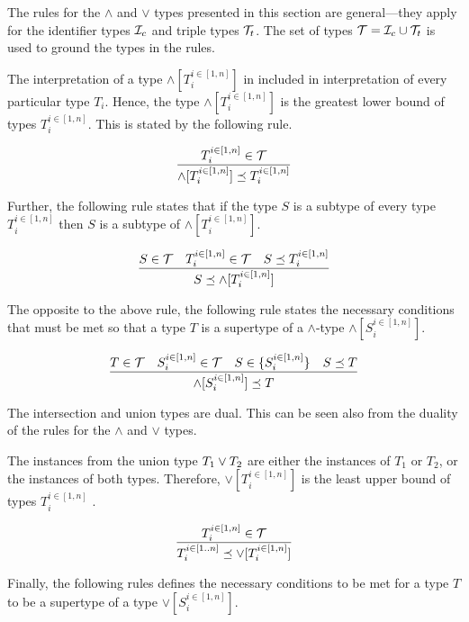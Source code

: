 \documentclass[runningheads]{llncs}
\newcommand{\I}{{\cal I}}
\newcommand{\T}{{\cal T}}
\begin{document}
The rules for the $\land$ and $\lor$ types presented in this section
are general---they apply for the identifier types $\I_c$ and triple
types $\T_t$. The set of types $\T=\I_c\cup\T_t$ is used to ground
the types in the rules.

The interpretation of a type $\land[T_i^{i\in[1,n]}]$ in included in
interpretation of every particular type $T_i$. Hence, the type
$\land[T_i^{i\in[1,n]}]$ is the greatest lower bound of types
$T_i^{i\in[1,n]}$. This is stated by the following rule.

\begin{equation}
\label{rul:land-preceq-elems}
\dfrac{T_i^{i\in[1,n]}\in\T}
      {\land[T_i^{i\in[1,n]}] \preceq\/T_i^{i\in[1,n]}} 
\end{equation}

Further, the following rule states that if the type $S$ is a subtype
of every type $T_i^{i\in[1,n]}$ then $S$ is a subtype of
$\land[T_i^{i\in[1,n]}]$.

\begin{equation}
\label{rul:lbound-preceq-land}
\dfrac{S\in\T\quad\/T_i^{i\in[1,n]}\in\T\quad\/S\preceq\/T_i^{i\in[1,n]}}
      {S\preceq\land[T_i^{i\in[1,n]}]}  
\end{equation} 

The opposite to the above rule, the following rule states the
necessary conditions that must be met so that a type $T$ is a
supertype of a $\land$-type $\land[S_i^{i\in[1,n]}]$.

\begin{equation}
\label{rul:land-preceq-ubound}
\dfrac{T\in\T\quad\/S_i^{i\in[1,n]}\in\T\quad\/S\in\{S_i^{i\in[1,n]}\}\quad\/S\preceq\/T}
      {\land[S_i^{i\in[1,n]}]\preceq\/T}  
\end{equation} 

The intersection and union types are dual. This can be seen also from
the duality of the rules for the $\land$ and $\lor$ types.

The instances from the union type $T_1\lor\/T_2$ are either the
instances of $T_1$ or $T_2$, or the instances of both
types. Therefore, $\lor[T_i^{i\in[1,n]}]$ is the least upper bound of
types $T_i^{i\in[1,n]}$ \cite{Pierce1991}.

\begin{equation}
\label{rul:lor-preceq-elems}
\dfrac{T_i^{i\in[1,n]}\in\T}
      {T_i^{i\in[1..n]}\preceq\/\lor[T_i^{i\in[1,n]}]}
\end{equation}

Finally, the following rules defines the necessary conditions to be
met for a type $T$ to be a supertype of a type
$\lor[S_i^{i\in[1,n]}]$.
\end{document}
